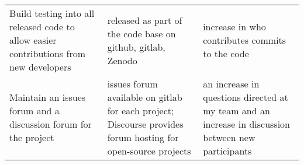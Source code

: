 \documentclass[11pt,oneside]{memoir}
\begin{document}
\begin{minipage}{\linewidth}
\begin{tabularx}{\textwidth}{ XXX }
      \addlinespace[1ex]
      Build testing into all released code to allow easier contributions from new developers
      & released as part of the code base on github, gitlab, Zenodo
      & increase in who contributes commits to the code\\

      \addlinespace[1ex]
      Maintain an issues forum and a discussion forum for the project
      & issues forum available on gitlab for each project; Discourse provides forum hosting for open-source projects
      & an increase in questions directed at my team and an increase in discussion between new participants\\

      \bottomrule
    \end{tabularx}
     \label{tab:title} 
\end{minipage}






\end{document}
